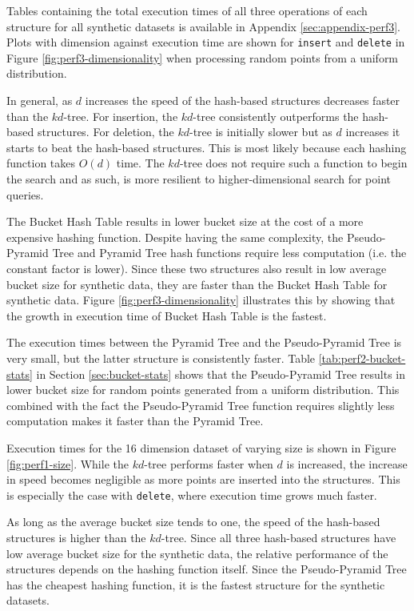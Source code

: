 
Tables containing the total execution times of all three operations of each structure for all synthetic datasets is available in Appendix \ref{sec:appendix-perf3}. Plots with dimension against execution time are shown for \texttt{insert} and \texttt{delete} in Figure \ref{fig:perf3-dimensionality} when processing random points from a uniform distribution.

In general, as $d$ increases the speed of the hash-based structures decreases faster than the $kd$-tree. For insertion, the $kd$-tree consistently outperforms the hash-based structures. For deletion, the $kd$-tree is initially slower but as $d$ increases it starts to beat the hash-based structures. This is most likely because each hashing function takes $O(d)$ time. The $kd$-tree does not require such a function to begin the search and as such, is more resilient to higher-dimensional search for point queries.

The Bucket Hash Table results in lower bucket size at the cost of a more expensive hashing function. Despite having the same complexity, the Pseudo-Pyramid Tree and Pyramid Tree hash functions require less computation (i.e. the constant factor is lower). Since these two structures also result in low average bucket size for synthetic data, they are faster than the Bucket Hash Table for synthetic data. Figure \ref{fig:perf3-dimensionality} illustrates this by showing that the growth in execution time of Bucket Hash Table is the fastest. 

The execution times between the Pyramid Tree and the Pseudo-Pyramid Tree is very small, but the latter structure is consistently faster. Table \ref{tab:perf2-bucket-stats} in Section \ref{sec:bucket-stats} shows that the Pseudo-Pyramid Tree results in lower bucket size for random points generated from a uniform distribution. This combined with the fact the Pseudo-Pyramid Tree function requires slightly less computation makes it faster than the Pyramid Tree.

Execution times for the 16 dimension dataset of varying size is shown in Figure \ref{fig:perf1-size}. While the $kd$-tree performs faster when $d$ is increased, the increase in speed becomes negligible as more points are inserted into the structures. This is especially the case with \texttt{delete}, where execution time grows much faster.

As long as the average bucket size tends to one, the speed of the hash-based structures is higher than the $kd$-tree. Since all three hash-based structures have low average bucket size for the synthetic data, the relative performance of the structures depends on the hashing function itself. Since the Pseudo-Pyramid Tree has the cheapest hashing function, it is the fastest structure for the synthetic datasets.

